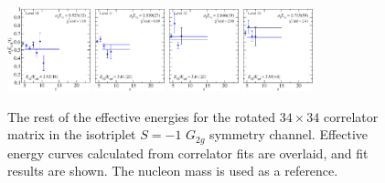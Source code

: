 \begin{figure}[H]
    \centering
    \includegraphics[width=0.215\textwidth]{figures/sigmas/g2g/fits/fit_25.pdf}
    \includegraphics[width=0.18\textwidth]{figures/sigmas/g2g/fits/fit_29.pdf}
    \includegraphics[width=0.18\textwidth]{figures/sigmas/g2g/fits/fit_33.pdf}
    \includegraphics[width=0.18\textwidth]{figures/sigmas/g2g/fits/fit_32.pdf}
    \caption[The rest of the effective energies for the rotated $34\times 34$ correlator matrix in the isotriplet $S=-1$ $G_{2g}$ symmetry channel.]{The rest of the effective energies for the rotated $34\times 34$ correlator matrix in the isotriplet $S=-1$ $G_{2g}$ symmetry channel. Effective energy curves calculated from correlator fits are overlaid, and fit results are shown. The nucleon mass is used as a reference.}\label{fig:g2g_fits2}
\end{figure}

